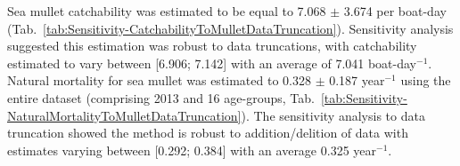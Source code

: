 Sea mullet catchability was estimated to be equal to 7.068 $\pm$ 3.674 per boat-day (Tab.~\ref{tab:Sensitivity-CatchabilityToMulletDataTruncation}). Sensitivity analysis suggested this estimation was robust to data truncations, with catchability estimated to vary between [6.906; 7.142] with an average of 7.041 boat-day$^{-1}$.\\


Natural mortality for sea mullet was estimated to 0.328 $\pm$ 0.187 year$^{-1}$ using the entire dataset (comprising 2013 and 16 age-groups, Tab.~\ref{tab:Sensitivity-NaturalMortalityToMulletDataTruncation}). The sensitivity analysis to data truncation showed the method is robust to addition/delition of data with estimates varying between [0.292; 0.384] with an average 0.325 year$^{-1}$. \\%
